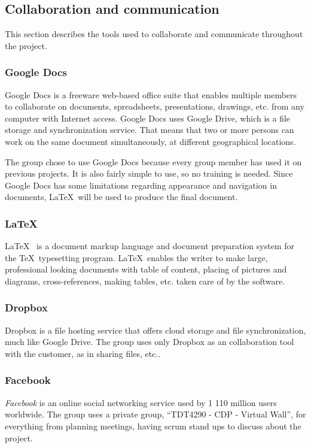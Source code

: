 \documentclass[11pt]{book}
\begin{document}
\subsection{Collaboration and communication}
This section describes the tools used to collaborate and communicate throughout the project.

\subsubsection{Google Docs}
Google Docs\cite{googleDocs} is a freeware web-based office suite that enables multiple members to collaborate on documents, spreadsheets, presentations, drawings, etc. from any computer with Internet access. Google Docs uses Google Drive, which is a file storage and synchronization service. That means that two or more persons can work on the same document simultaneously, at different geographical locations. 

The group chose to use Google Docs because every group member has used it on previous projects. It is also fairly simple to use, so no training is needed. Since Google Docs has some limitations regarding appearance and navigation in documents, \LaTeX~will be used to produce the final document.

\subsubsection{\LaTeX}
\LaTeX~\cite{latex} is a document markup language and document preparation system for the \TeX~typesetting program. \LaTeX~enables the writer to make large, professional looking documents with table of content, placing of pictures and diagrams, cross-references, making tables, etc. taken care of by the software. 

\subsubsection{Dropbox}
Dropbox\cite{dropbox} is a file hosting service that offers cloud storage and file synchronization, much like Google Drive. The group uses only Dropbox as an collaboration tool with the customer, as in sharing files, etc..

\subsubsection{Facebook}
\emph{Facebook} is an online social networking service used by 1 110 million users worldwide\cite{facebook}. The group uses a private group, ``TDT4290 - CDP - Virtual Wall'', for everything from planning meetings, having scrum stand ups to discuss about the project.
\end{document}
